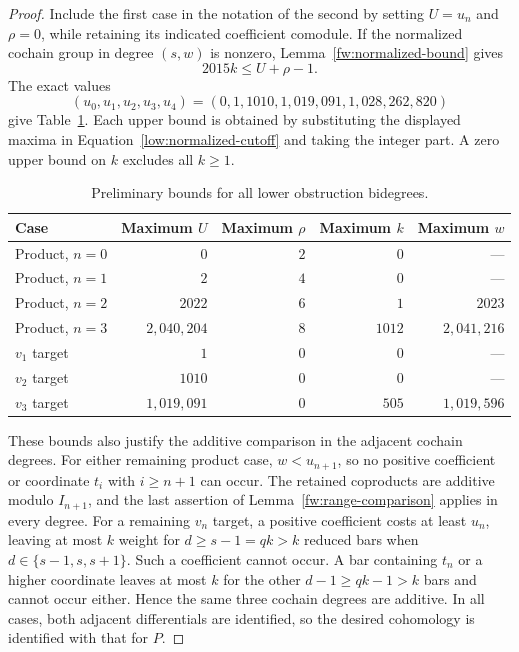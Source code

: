 \begin{proof}
Include the first case in the notation of the second by setting
$U=u_n$ and $\rho=0$, while retaining its indicated coefficient comodule.
If the normalized cochain group in degree $(s,w)$ is nonzero,
Lemma~\ref{fw:normalized-bound} gives
\begin{equation}
 2015k\leq U+\rho-1.
 \label{low:normalized-cutoff}
\end{equation}
The exact values
\[
 (u_0,u_1,u_2,u_3,u_4)=(0,1,1010,1{,}019{,}091,1{,}028{,}262{,}820)
\]
give Table~\ref{low:cutoffs}.  Each upper bound is obtained by substituting
the displayed maxima in Equation~\eqref{low:normalized-cutoff} and taking
the integer part.  A zero upper bound on $k$ excludes all $k\geq1$.

\begin{table}[htbp]
\centering
\begin{tabular}{lrrrr}
\toprule
Case & Maximum $U$ & Maximum $\rho$ & Maximum $k$ & Maximum $w$\\
\midrule
Product, $n=0$ & $0$ & $2$ & $0$ & ---\\
Product, $n=1$ & $2$ & $4$ & $0$ & ---\\
Product, $n=2$ & $2022$ & $6$ & $1$ & $2023$\\
Product, $n=3$ & $2{,}040{,}204$ & $8$ & $1012$ & $2{,}041{,}216$\\
$v_1$ target & $1$ & $0$ & $0$ & ---\\
$v_2$ target & $1010$ & $0$ & $0$ & ---\\
$v_3$ target & $1{,}019{,}091$ & $0$ & $505$ & $1{,}019{,}596$\\
\bottomrule
\end{tabular}
\caption{Preliminary bounds for all lower obstruction bidegrees.}
\label{low:cutoffs}
\end{table}

These bounds also justify the additive comparison in the adjacent cochain
degrees.  For either remaining product case, $w<u_{n+1}$, so no positive
coefficient or coordinate $t_i$ with $i\geq n+1$ can occur.  The retained
coproducts are additive modulo $I_{n+1}$, and the last assertion of
Lemma~\ref{fw:range-comparison} applies in every degree.  For a remaining
$v_n$ target, a positive coefficient costs at least $u_n$, leaving at most
$k$ weight for $d\geq s-1=qk>k$ reduced bars when
$d\in\{s-1,s,s+1\}$.  Such a coefficient cannot occur.  A bar containing
$t_n$ or a higher coordinate leaves at most $k$ for the other
$d-1\geq qk-1>k$ bars and cannot occur either.  Hence the same three
cochain degrees are additive.  In all cases, both adjacent differentials
are identified, so the desired cohomology is identified with that for $P$.


\end{proof}
